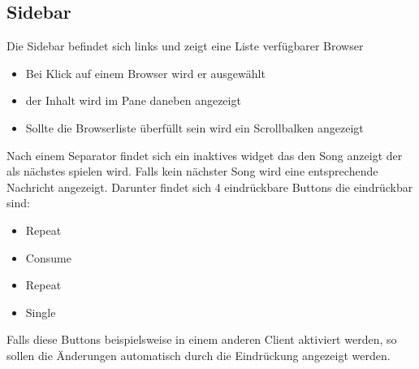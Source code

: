 \subsection{Sidebar}
Die Sidebar befindet sich links und zeigt eine Liste verfügbarer Browser
\begin{itemize}
    \item Bei Klick auf einem Browser wird er ausgewählt
    \item der Inhalt wird im Pane daneben angezeigt
    \item Sollte die Browserliste überfüllt sein wird ein Scrollbalken angezeigt
\end{itemize}
Nach einem Separator findet sich ein inaktives widget das den Song anzeigt der als nächstes spielen wird.
Falls kein nächster Song wird eine entsprechende Nachricht angezeigt.
Darunter findet sich 4 eindrückbare Buttons die eindrückbar sind:
\begin{itemize}
    \item Repeat
    \item Consume
    \item Repeat
    \item Single
\end{itemize}
Falls diese Buttons beispielsweise in einem anderen Client aktiviert werden, 
so sollen die Änderungen automatisch durch die Eindrückung angezeigt werden.



